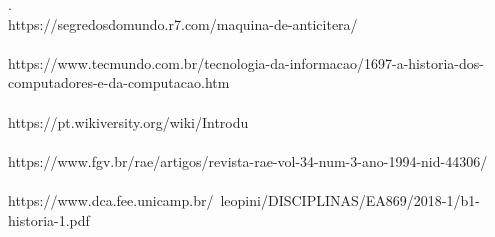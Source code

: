 \documentclass[
	12pt,				%
	openright,			%
	twoside,			%
	a4paper,			%
	english,			%
	french,				%
	spanish,			%
	brazil,				%
	]{abntex2}
\begin{document}


.\\
https://segredosdomundo.r7.com/maquina-de-anticitera/
\\
\\
https://www.tecmundo.com.br/tecnologia-da-informacao/1697-a-historia-dos-computadores-e-da-computacao.htm
\\
\\
https://pt.wikiversity.org/wiki/Introdu%
\\
\\
https://www.fgv.br/rae/artigos/revista-rae-vol-34-num-3-ano-1994-nid-44306/
\\
\\
https://www.dca.fee.unicamp.br/~leopini/DISCIPLINAS/EA869/2018-1/b1-historia-1.pdf
%
%






\end{document}

